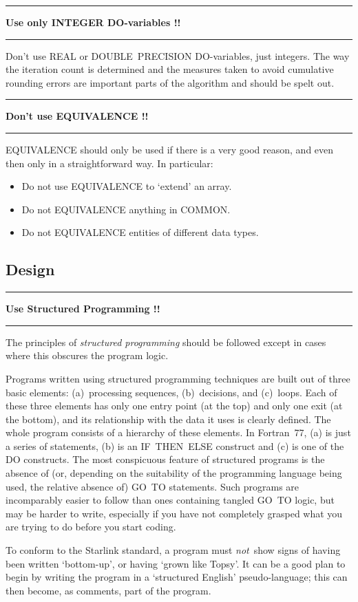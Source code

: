 \documentclass[twoside,11pt,nolof,noabs]{starlink}
\newcounter{sruleno}
\providecommand{\srule}[1]{
    \addtocounter{sruleno}{1}
    \goodbreak
    \rule{\textwidth}{0.3mm}
    \textbf{#1} \scpushright{ \textbf{\thesruleno}}
    \rule{\textwidth}{0.1mm}
}
\renewcommand{\_}{{\tt\char'137}}
\begin{document}
\srule{Use only INTEGER DO-variables !!}
Don't use REAL or DOUBLE~PRECISION DO-variables, just integers.
The way the iteration count is determined and the
measures taken to avoid cumulative rounding errors are
important parts of the algorithm and should be spelt out.

\srule{Don't use EQUIVALENCE !!}
EQUIVALENCE should only be used if there is a very good reason, and even then
only in a straightforward way.  In particular:
\begin{itemize}
\item Do not use EQUIVALENCE to `extend' an array.
\item Do not EQUIVALENCE anything in COMMON.
\item Do not EQUIVALENCE entities of different data types.
\end{itemize}

\goodbreak
\subsection{Design}

\srule{Use Structured Programming !!}
The principles of \emph{structured programming} should
be followed except in cases where this obscures the program logic.

Programs written using structured programming techniques
are built out of three basic elements:
(a)~processing sequences, (b)~decisions, and
(c)~loops.  Each of these three elements has
only one entry point (at the top) and only one exit (at the
bottom), and its relationship with the data it uses is
clearly defined.  The whole program consists of a hierarchy of
these elements.  In Fortran~77, (a) is just a series of
statements, (b) is an IF~THEN~ELSE construct and (c) is one
of the DO constructs.  The most
conspicuous feature of structured programs is the
absence of (or, depending on the suitability of the programming
language being used, the relative absence of)
GO~TO statements.  Such programs are incomparably easier to follow
than ones containing tangled GO~TO logic, but may be harder to
write, especially if you have not completely
grasped what you are trying to do before you start coding.

To conform to the Starlink standard, a program must \textit{not}\, show signs of
having been written `bottom-up', or having `grown like Topsy'.
It can be a good plan to begin by writing the program in a `structured English'
pseudo-language; this can then become, as comments, part of the program.
\end{document}
